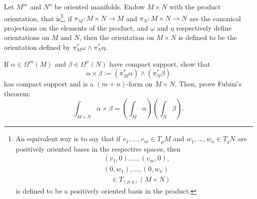 \begin{exercise}\label{exe:fubini}
	Let $M^m$ and $N^n$ be oriented manifolds. Endow $M\times N$ with the product orientation, that is\footnote{An equivalent way is to say that if $v_1,\ldots,v_m\in T_pM$ and $w_1, \ldots, w_n\in T_q N$ are positively oriented bases in the respective spaces, then \begin{align}
			 & (v_1,0),\ldots,(v_m,0),       \\
			 & (0,w_1), \ldots, (0,w_n)      \\
			 & \quad\in T_{(p,q)}(M\times N)
		\end{align}
		is defined to be a positively oriented basis in the product.}, if $\pi_M : M\times N \to M$ and $\pi_N: M\times N \to N$ are the canonical projections on the elements of the product, and $\omega$ and $\eta$ respectively define orientations on $M$ and $N$, then the orientation on $M\times N$ is defined to be the orientation defined by $\pi_M^* \omega \wedge \pi_N^* \eta$.

	If $\alpha\in\Omega^m(M)$ and $\beta\in\Omega^n(N)$ have compact support, show that
	\begin{equation}
		\alpha\times\beta := (\pi_M^*\alpha)\wedge(\pi_N^*\beta)
	\end{equation}
	has compact support and is a $(m+n)$-form on $M\times N$.
	Then, prove Fubini's theorem:
	\begin{equation}
		\int_{M\times N}\alpha\times\beta = \left(\int_M\alpha\right)\left(\int_N\beta\right).
	\end{equation}
\end{exercise}

